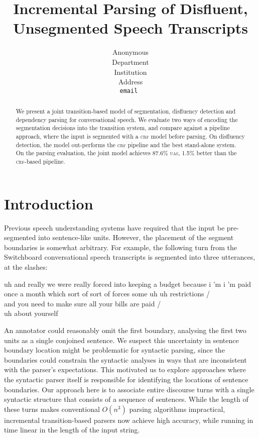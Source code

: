 \documentclass[11pt,letterpaper]{article}
\title{Incremental Parsing of Disfluent, Unsegmented Speech Transcripts}
\author{
	Anonymous\\
  	Department\\
  	Institution\\
  	Address\\
  {\tt \small email }\\
}
\date{}
\begin{document}
\maketitle
\begin{abstract}
We present a joint transition-based model of segmentation, disfluency detection
and dependency parsing for conversational speech.  We evaluate two ways of encoding
the segmentation decisions into the transition system, and compare against a pipeline
approach, where the input is segmented with a \textsc{crf} model before parsing.
On disfluency detection, the model out-performs the \textsc{crf} pipeline and the
best stand-alone system.
On the parsing evaluation, the joint model achieves 87.6\% \textsc{uas}, 1.5\%
better than the \textsc{crf}-based pipeline.
\end{abstract}

\section{Introduction}


Previous speech understanding systems have required that the input be
pre-segmented into sentence-like units.  However, the placement of the segment
boundaries is somewhat arbitrary.  For example, the following turn from the
Switchboard conversational speech transcripts is segmented into three utterances,
at the slashes:

\begin{lexample}
\small
uh and really we were really forced into keeping a budget because i 'm i 'm paid
once a month which sort of sort of forces some uh uh restrictions / \\
and you need to make sure all your bills are paid / \\
uh about yourself
\end{lexample}

\noindent An annotator could reasonably omit the first boundary, analysing
the first two units as a single conjoined sentence.  
We suspect this uncertainty in sentence boundary location
might be problematic for syntactic parsing, since the boundaries could
constrain the syntactic analyses in ways that are inconsistent with the parser's
expectations.  This motivated us to explore approaches where the syntactic parser
itself is responsible for identifying the locations of sentence boundaries.  Our
approach here is to associate entire discourse turns with a single syntactic
structure that consists of a sequence of sentences.
While the length of these turns makes conventional $O(n^3)$ parsing algorithms
impractical, incremental transition-based parsers now achieve high accuracy,
while running in time linear in the length of the input string.
\end{document}
